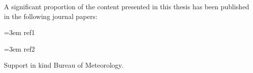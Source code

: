 
\begin{preface}

A significant proportion of the content presented in this thesis has been published in the following journal papers:

\vspace{5mm}
\hangindent=3em
ref1 

\vspace{5mm}
\hangindent=3em
ref2

\vspace{5mm}
\noindent  Support in kind Bureau of Meteorology. 

\end{preface}

